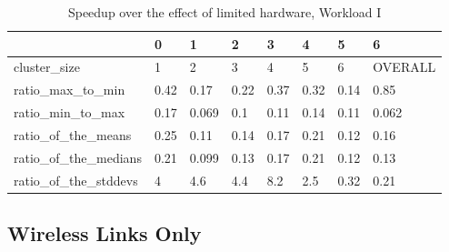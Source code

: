\begin{table}[H]
\centering
\begin{tabular}{llllllll}
\toprule
{} &    0 &     1 &    2 &    3 &    4 &    5 &        6 \\
\midrule
cluster\_size         &    1 &     2 &    3 &    4 &    5 &    6 &  OVERALL \\
ratio\_max\_to\_min     & 0.42 &  0.17 & 0.22 & 0.37 & 0.32 & 0.14 &     0.85 \\
ratio\_min\_to\_max     & 0.17 & 0.069 &  0.1 & 0.11 & 0.14 & 0.11 &    0.062 \\
ratio\_of\_the\_means   & 0.25 &  0.11 & 0.14 & 0.17 & 0.21 & 0.12 &     0.16 \\
ratio\_of\_the\_medians & 0.21 & 0.099 & 0.13 & 0.17 & 0.21 & 0.12 &     0.13 \\
ratio\_of\_the\_stddevs &    4 &   4.6 &  4.4 &  8.2 &  2.5 & 0.32 &     0.21 \\
\bottomrule
\end{tabular}
\caption{Speedup over the effect of limited hardware, Workload I}
\label{table:rp_v_vm_i_speedup}
\end{table}





\subsection{Wireless Links Only}
